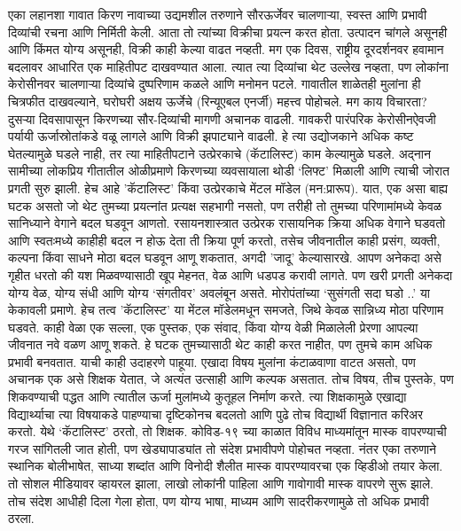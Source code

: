 एका लहानशा गावात किरण नावाच्या उद्यमशील तरुणाने सौरऊर्जेवर चालणाऱ्या, स्वस्त आणि प्रभावी दिव्यांची रचना आणि निर्मिती केली. आता तो त्यांच्या विक्रीचा प्रयत्न करत होता. उत्पादन चांगले असूनही आणि किंमत योग्य असूनही, विक्री काही केल्या वाढत नव्हती. मग एक दिवस, राष्ट्रीय दूरदर्शनवर हवामान बदलावर आधारित एक माहितीपट दाखवण्यात आला. त्यात त्या दिव्यांचा थेट उल्लेख नव्हता, पण लोकांना केरोसीनवर चालणाऱ्या दिव्यांचे दुष्परिणाम कळले आणि मनोमन पटले. गावातील शाळेतही मुलांना ही चित्रफीत दाखवल्याने, घरोघरी अक्षय ऊर्जेचे (रिन्यूएबल एनर्जी) महत्त्व पोहोचले. मग काय विचारता? दुसऱ्या दिवसापासून किरणच्या सौर-दिव्यांची मागणी अचानक वाढली. गावकरी पारंपरिक केरोसीनऐवजी पर्यायी ऊर्जास्रोतांकडे वळू लागले आणि विक्री झपाट्याने वाढली. हे त्या उद्योजकाने अधिक कष्ट घेतल्यामुळे घडले नाही, तर त्या माहितीपटाने उत्प्रेरकाचे (कॅटालिस्ट) काम केल्यामुळे घडले. अद्नान सामीच्या लोकप्रिय गीतातील ओळीप्रमाणे किरणच्या व्यवसायाला थोडी ‘लिफ्ट’ मिळाली आणि त्याची जोरात प्रगती सुरु झाली. 
हेच आहे 'कॅटालिस्ट' किंवा उत्प्रेरकाचे मेंटल मॉडेल (मन:प्रारूप). यात, एक असा बाह्य घटक असतो जो थेट तुमच्या प्रयत्नांत प्रत्यक्ष सहभागी नसतो, पण तरीही तो तुमच्या परिणामांमध्ये केवळ सानिध्याने वेगाने बदल घडवून आणतो. रसायनशास्त्रात उत्प्रेरक रासायनिक क्रिया अधिक वेगाने घडवतो आणि स्वतःमध्ये काहीही बदल न होऊ देता ती क्रिया पूर्ण करतो, तसेच जीवनातील काही प्रसंग, व्यक्ती, कल्पना किंवा साधने मोठा बदल घडवून आणू शकतात, अगदी 'जादू' केल्यासारखे.
आपण अनेकदा असे गृहीत धरतो की यश मिळवण्यासाठी खूप मेहनत, वेळ आणि धडपड करावी लागते. पण खरी प्रगती अनेकदा योग्य वेळ, योग्य संधी आणि योग्य ‘संगतीवर’ अवलंबून असते. मोरोपंतांच्या ‘सुसंगती सदा घडो ..’ या केकावली प्रमाणे. हेच तत्व 'कॅटालिस्ट' या मेंटल मॉडेलमधून समजते, जिथे केवळ सान्निध्य मोठा परिणाम घडवते. काही वेळा एक सल्ला, एक पुस्तक, एक संवाद, किंवा योग्य वेळी मिळालेली प्रेरणा आपल्या जीवनात नवे वळण आणू शकते. हे घटक तुमच्यासाठी थेट काही करत नाहीत, पण तुमचे काम अधिक प्रभावी बनवतात. याची काही उदाहरणे पाहूया.
एखादा विषय मुलांना कंटाळवाणा वाटत असतो, पण अचानक एक असे शिक्षक येतात, जे अत्यंत उत्साही आणि कल्पक असतात. तोच विषय, तीच पुस्तके, पण शिकवण्याची पद्धत आणि त्यातील ऊर्जा मुलांमध्ये कुतूहल निर्माण करते. त्या शिक्षकामुळे एखाद्या विद्यार्थ्याचा त्या विषयाकडे पाहण्याचा दृष्टिकोनच बदलतो आणि पुढे तोच विद्यार्थी विज्ञानात करिअर करतो. येथे ‘कॅटालिस्ट’ ठरतो, तो शिक्षक.
कोविड-१९ च्या काळात विविध माध्यमांतून मास्क वापरण्याची गरज सांगितली जात होती, पण खेड्यापाड्यांत तो संदेश प्रभावीपणे पोहोचत नव्हता. नंतर एका तरुणाने स्थानिक बोलीभाषेत, साध्या शब्दांत आणि विनोदी शैलीत मास्क वापरण्यावरचा एक व्हिडीओ तयार केला. तो सोशल मीडियावर व्हायरल झाला, लाखो लोकांनी पाहिला आणि गावोगावी मास्क वापरणे सुरू झाले. तोच संदेश आधीही दिला गेला होता, पण योग्य भाषा, माध्यम आणि सादरीकरणामुळे तो अधिक प्रभावी ठरला.
